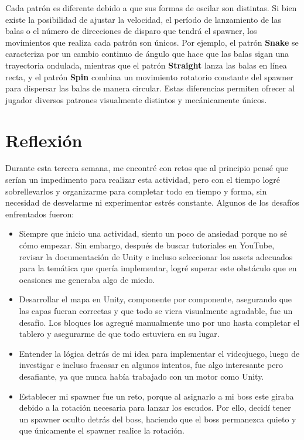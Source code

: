\documentclass[11pt]{article}
\begin{document}
\begin{itemize}
    \vspace{0.5cm}
    
    Cada patrón es diferente debido a que sus formas de oscilar son distintas. Si bien existe la posibilidad de ajustar la velocidad, el período de lanzamiento de las balas o el número de direcciones de disparo que tendrá el spawner, los movimientos que realiza cada patrón son únicos. Por ejemplo, el patrón \textbf{Snake} se caracteriza por un cambio continuo de ángulo que hace que las balas sigan una trayectoria ondulada, mientras que el patrón \textbf{Straight} lanza las balas en línea recta, y el patrón \textbf{Spin} combina un movimiento rotatorio constante del spawner para dispersar las balas de manera circular. Estas diferencias permiten ofrecer al jugador diversos patrones visualmente distintos y mecánicamente únicos.   

  \end{itemize}
    
  \section*{Reflexión}

    Durante esta tercera semana, me encontré con retos que al principio pensé que serían un impedimento para realizar esta actividad, pero con el tiempo logré sobrellevarlos y organizarme para completar todo en tiempo y forma, sin necesidad de desvelarme ni experimentar estrés constante. Algunos de los desafíos enfrentados fueron: 

    \begin{itemize}
      \item Siempre que inicio una actividad, siento un poco de ansiedad porque no sé cómo empezar. Sin embargo, después de buscar tutoriales en YouTube, revisar la documentación de Unity e incluso seleccionar los assets adecuados para la temática que quería implementar, logré superar este obstáculo que en ocasiones me generaba algo de miedo.
      
      \item Desarrollar el mapa en Unity, componente por componente, asegurando que las capas fueran correctas y que todo se viera visualmente agradable, fue un desafío. Los bloques los agregué manualmente uno por uno hasta completar el tablero y asegurarme de que todo estuviera en su lugar.
      
      \item Entender la lógica detrás de mi idea para implementar el videojuego, luego de investigar e incluso fracasar en algunos intentos, fue algo interesante pero desafiante, ya que nunca había trabajado con un motor como Unity.
      
      \item Establecer mi spawner fue un reto, porque al asignarlo a mi boss este giraba debido a la rotación necesaria para lanzar los escudos. Por ello, decidí tener un spawner oculto detrás del boss, haciendo que el boss permanezca quieto y que únicamente el spawner realice la rotación.
    \end{itemize}
\end{document}
